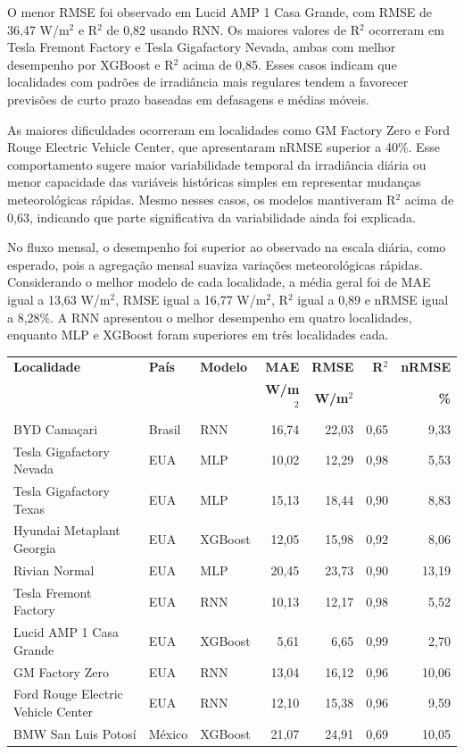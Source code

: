 \documentclass[12pt,a4paper]{article}
\begin{document}
\vspace{6pt}

O menor RMSE foi observado em Lucid AMP 1 Casa Grande, com RMSE de 36,47 W/m$^2$ e R$^2$ de 0,82 usando RNN. Os maiores valores de R$^2$ ocorreram em Tesla Fremont Factory e Tesla Gigafactory Nevada, ambas com melhor desempenho por XGBoost e R$^2$ acima de 0,85. Esses casos indicam que localidades com padrões de irradiância mais regulares tendem a favorecer previsões de curto prazo baseadas em defasagens e médias móveis.

As maiores dificuldades ocorreram em localidades como GM Factory Zero e Ford Rouge Electric Vehicle Center, que apresentaram nRMSE superior a 40\%. Esse comportamento sugere maior variabilidade temporal da irradiância diária ou menor capacidade das variáveis históricas simples em representar mudanças meteorológicas rápidas. Mesmo nesses casos, os modelos mantiveram R$^2$ acima de 0,63, indicando que parte significativa da variabilidade ainda foi explicada.

No fluxo mensal, o desempenho foi superior ao observado na escala diária, como esperado, pois a agregação mensal suaviza variações meteorológicas rápidas. Considerando o melhor modelo de cada localidade, a média geral foi de MAE igual a 13,63 W/m$^2$, RMSE igual a 16,77 W/m$^2$, R$^2$ igual a 0,89 e nRMSE igual a 8,28\%. A RNN apresentou o melhor desempenho em quatro localidades, enquanto MLP e XGBoost foram superiores em três localidades cada.

\vspace{6pt}

\begin{center}
\small
\begin{tabular}{p{5.2cm}p{1.6cm}p{1.9cm}rrrr}
\toprule
\textbf{Localidade} & \textbf{País} & \textbf{Modelo} & \textbf{MAE} & \textbf{RMSE} & \textbf{R$^2$} & \textbf{nRMSE} \\
 & & & \textbf{W/m$^2$} & \textbf{W/m$^2$} & & \textbf{\%} \\
\midrule
BYD Camaçari & Brasil & RNN & 16,74 & 22,03 & 0,65 & 9,33 \\
Tesla Gigafactory Nevada & EUA & MLP & 10,02 & 12,29 & 0,98 & 5,53 \\
Tesla Gigafactory Texas & EUA & MLP & 15,13 & 18,44 & 0,90 & 8,83 \\
Hyundai Metaplant Georgia & EUA & XGBoost & 12,05 & 15,98 & 0,92 & 8,06 \\
Rivian Normal & EUA & MLP & 20,45 & 23,73 & 0,90 & 13,19 \\
Tesla Fremont Factory & EUA & RNN & 10,13 & 12,17 & 0,98 & 5,52 \\
Lucid AMP 1 Casa Grande & EUA & XGBoost & 5,61 & 6,65 & 0,99 & 2,70 \\
GM Factory Zero & EUA & RNN & 13,04 & 16,12 & 0,96 & 10,06 \\
Ford Rouge Electric Vehicle Center & EUA & RNN & 12,10 & 15,38 & 0,96 & 9,59 \\
BMW San Luis Potosí & México & XGBoost & 21,07 & 24,91 & 0,69 & 10,05 \\
\bottomrule
\end{tabular}
\end{center}
\end{document}
